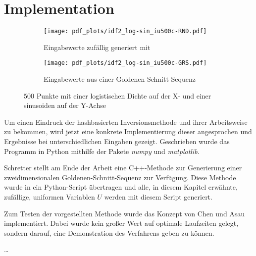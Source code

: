 \section{Implementation}
\label{impl}
\begin{figure*}[htb!]
    \centering
    \begin{subfigure}[b]{.3\textwidth}
        \centering
        \texttt{[image: pdf\_plots/idf2\_log-sin\_iu500c-RND.pdf]}
        \caption{Eingabewerte zufällig generiert mit }
        \label{fig:logsin_random}
    \end{subfigure}
    \hfill
    \begin{subfigure}[b]{.3\textwidth}
        \centering
        \texttt{[image: pdf\_plots/idf2\_log-sin\_iu500c-GRS.pdf]}
        \caption{Eingabewerte aus einer Goldenen Schnitt Sequenz}
        \label{fig:logsin_uniform}
    \end{subfigure}
    \caption{$500$ Punkte mit einer logistischen Dichte auf der X- und einer sinusoiden auf der Y-Achse}
    \label{fig:rand_vs_uniform}
\end{figure*}


Um einen Eindruck der hashbasierten Inversionsmethode und ihrer Arbeitsweise zu bekommen, 
wird jetzt eine konkrete Implementierung dieser angesprochen und Ergebnisse bei 
unterschiedlichen Eingaben gezeigt. Geschrieben wurde das Programm in Python mithilfe der 
Pakete \textit{numpy} und \textit{matplotlib}.

Schretter \cite{schretter-golden_ratio_sequences-2012} stellt am Ende der Arbeit eine 
C++-Methode zur Generierung einer zweidimensionalen Goldenen-Schnitt-Sequenz zur Verfügung. 
Diese Methode wurde in ein Python-Script übertragen und alle, in diesem Kapitel erwähnte, zufällige, uniformen
Variablen $U$ werden mit diesem Script generiert.

Zum Testen der vorgestellten Methode wurde das Konzept von Chen und Asau \cite{chen_asau-generating_random_variates-1974} 
implementiert. Dabei wurde kein großer Wert auf optimale Laufzeiten gelegt, sondern darauf, eine Demonstration 
des Verfahrens geben zu können.

\dots


